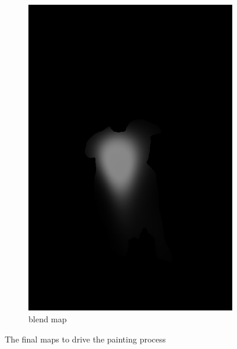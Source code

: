 \documentclass[11pt]{article}
\begin{document}
\begin{figure}[h]
\begin{subfigure}[b]{0.25\textwidth}
         \includegraphics[width=\textwidth]{finalblend-2.jpg}
         \caption{blend map}
         \label{fig:blend}
     \end{subfigure}
     \caption{The final maps to drive the painting process}
    \label{fig:maps}
\end{figure}
\end{document}
